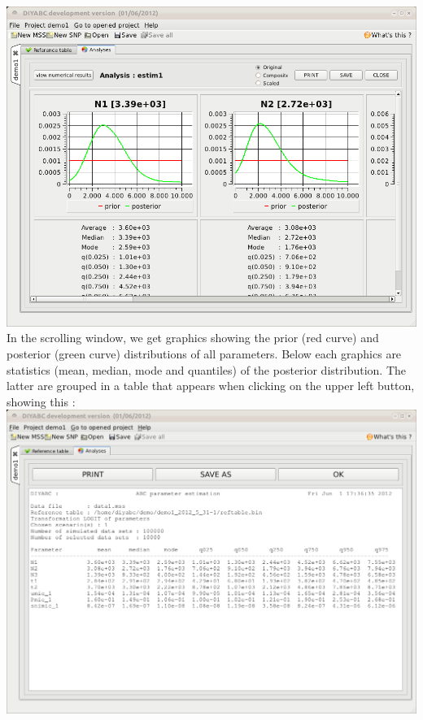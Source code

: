 \includegraphics[scale=0.35]{gui_pictures/Capture-DIYABC-40.png} \\

In the scrolling window, we get graphics showing the prior (red curve) and posterior (green curve) distributions of all parameters. Below each graphics are statistics (mean, median, mode and quantiles) of the posterior distribution. The latter are grouped in a table that appears when clicking on the upper left  button, showing this :\\

\includegraphics[scale=0.35]{gui_pictures/Capture-DIYABC-41.png} \\

